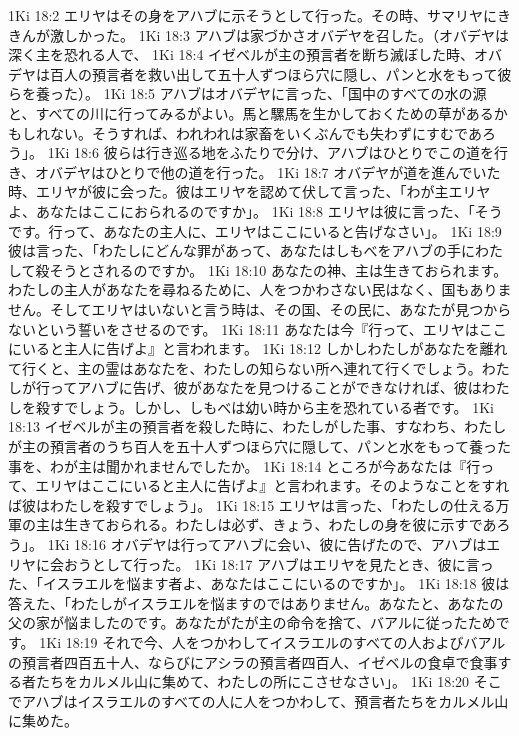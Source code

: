1Ki 18:2  エリヤはその身をアハブに示そうとして行った。その時、サマリヤにききんが激しかった。
1Ki 18:3  アハブは家づかさオバデヤを召した。（オバデヤは深く主を恐れる人で、
1Ki 18:4  イゼベルが主の預言者を断ち滅ぼした時、オバデヤは百人の預言者を救い出して五十人ずつほら穴に隠し、パンと水をもって彼らを養った）。
1Ki 18:5  アハブはオバデヤに言った、「国中のすべての水の源と、すべての川に行ってみるがよい。馬と騾馬を生かしておくための草があるかもしれない。そうすれば、われわれは家畜をいくぶんでも失わずにすむであろう」。
1Ki 18:6  彼らは行き巡る地をふたりで分け、アハブはひとりでこの道を行き、オバデヤはひとりで他の道を行った。
1Ki 18:7  オバデヤが道を進んでいた時、エリヤが彼に会った。彼はエリヤを認めて伏して言った、「わが主エリヤよ、あなたはここにおられるのですか」。
1Ki 18:8  エリヤは彼に言った、「そうです。行って、あなたの主人に、エリヤはここにいると告げなさい」。
1Ki 18:9  彼は言った、「わたしにどんな罪があって、あなたはしもべをアハブの手にわたして殺そうとされるのですか。
1Ki 18:10  あなたの神、主は生きておられます。わたしの主人があなたを尋ねるために、人をつかわさない民はなく、国もありません。そしてエリヤはいないと言う時は、その国、その民に、あなたが見つからないという誓いをさせるのです。
1Ki 18:11  あなたは今『行って、エリヤはここにいると主人に告げよ』と言われます。
1Ki 18:12  しかしわたしがあなたを離れて行くと、主の霊はあなたを、わたしの知らない所へ連れて行くでしょう。わたしが行ってアハブに告げ、彼があなたを見つけることができなければ、彼はわたしを殺すでしょう。しかし、しもべは幼い時から主を恐れている者です。
1Ki 18:13  イゼベルが主の預言者を殺した時に、わたしがした事、すなわち、わたしが主の預言者のうち百人を五十人ずつほら穴に隠して、パンと水をもって養った事を、わが主は聞かれませんでしたか。
1Ki 18:14  ところが今あなたは『行って、エリヤはここにいると主人に告げよ』と言われます。そのようなことをすれば彼はわたしを殺すでしょう」。
1Ki 18:15  エリヤは言った、「わたしの仕える万軍の主は生きておられる。わたしは必ず、きょう、わたしの身を彼に示すであろう」。
1Ki 18:16  オバデヤは行ってアハブに会い、彼に告げたので、アハブはエリヤに会おうとして行った。
1Ki 18:17  アハブはエリヤを見たとき、彼に言った、「イスラエルを悩ます者よ、あなたはここにいるのですか」。
1Ki 18:18  彼は答えた、「わたしがイスラエルを悩ますのではありません。あなたと、あなたの父の家が悩ましたのです。あなたがたが主の命令を捨て、バアルに従ったためです。
1Ki 18:19  それで今、人をつかわしてイスラエルのすべての人およびバアルの預言者四百五十人、ならびにアシラの預言者四百人、イゼベルの食卓で食事する者たちをカルメル山に集めて、わたしの所にこさせなさい」。
1Ki 18:20  そこでアハブはイスラエルのすべての人に人をつかわして、預言者たちをカルメル山に集めた。
